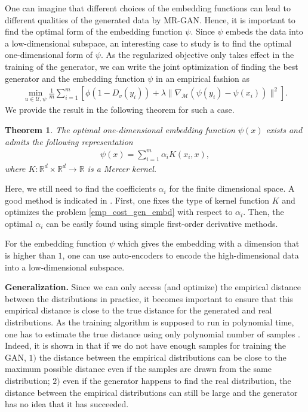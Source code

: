 \documentclass[10pt,twocolumn,letterpaper]{article}
\newcommand{\di}{{D_v}}
\newcommand{\U}{\mathcal{U}}
\newcommand{\M}{\mathcal{M}}
\newtheorem{thm}{Theorem}
\begin{document}
One can imagine that different choices of the embedding functions can lead to different qualities of the generated data by MR-GAN. Hence, it is important to find the optimal form of the embedding function $\psi$. Since $\psi$ embeds the data into a low-dimensional subspace, an interesting case to study is to find the optimal one-dimensional form of $\psi$. As the regularized objective only takes effect in the training of the generator, we can write the joint optimization of finding the best generator and the embedding function $\psi$ in an empirical fashion as
\begin{align}\label{emp_cost_gen_embd}
\min_{u\in \U, \psi}  \frac{1}{m}\sum_{i=1}^m [\phi(1-\di(y_i))
+\lambda \|\nabla_\M (\psi(y_i)-\psi(x_i))\|^2].
\end{align}
We provide the result in the following theorem for such a case.
\begin{thm}\label{embedding}
	The optimal one-dimensional embedding function $\psi(x)$ exists and admits the following representation
	\begin{align}
	\psi(x)=\sum_{i=1}^{m}\alpha_i K(x_i,x),
	\end{align}
	where $K: \mathbb{R}^d \times \mathbb{R}^d \rightarrow \mathbb{R}$ is a Mercer kernel.
\end{thm}
Here, we still need to find the coefficients $\alpha_i$ for the finite dimensional space. A good method is indicated in \cite{belkin2006manifold}. First, one fixes the type of kernel function $K$ and optimizes the problem \eqref{emp_cost_gen_embd} with respect to $\alpha_i$. Then, the optimal $\alpha_i$ can be easily found using simple first-order derivative methods. 

For the embedding function $\psi$ which gives the embedding with a dimension that is higher than $1$, one can use auto-encoders to encode the high-dimensional data into a low-dimensional subspace.

\textbf{Generalization.}
Since we can only access (and optimize) the empirical distance between the distributions in practice, it becomes important to ensure that this empirical distance is close to the true distance for the generated and real distributions. As the training algorithm is supposed to run in polynomial time, one has to estimate the true distance using only polynomial number of samples \cite{arora2017generalization}. Indeed, it is shown in \cite{arora2017generalization} that if we do not have enough samples for training the GAN, $1)$ the distance between the empirical distributions can be close to the maximum possible distance even if the samples are drawn from the same distribution; $2)$ even if the generator happens to find the real distribution, the
distance between the empirical distributions can still be large and the generator has no idea that
it has succeeded.
\end{document}
